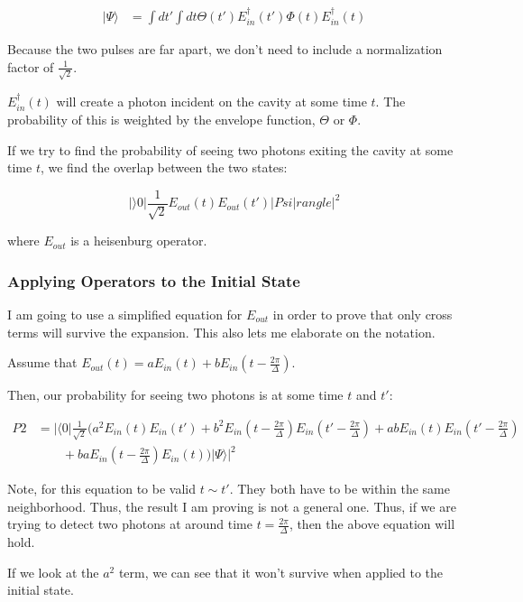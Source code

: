 \documentclass[12pt]{article}
\begin{document}
\begin{align}
| \Psi \rangle &= \int d t' \int dt \Theta(t') E^\dagger_{in}(t') \Phi (t) E^\dagger_{in}(t)
\end{align}

Because the two pulses are far apart, we don't need to include a normalization factor of $\frac{1}{\sqrt{2}}$.

$E^\dagger_{in}(t)$ will create a photon incident on the cavity at some time $t$. The probability of this is weighted by
the envelope function, $\Theta$ or $\Phi$.

If we try to find the probability of seeing two photons exiting the cavity at some time $t$, we find the overlap between the two states:

\begin{equation}
| \rangle 0 | \frac{1}{\sqrt{2}} E_{out}(t) E_{out}(t') |Psi |rangle |^2
\end{equation}

where $E_{out}$ is a heisenburg operator.
\subsubsection{Applying Operators to the Initial State}
\label{sec:crossterms}
I am going to use a simplified equation for $E_{out}$ in order to prove that only cross terms will survive the expansion. This also lets me elaborate on the notation.

Assume that $E_{out}(t) = a E_{in}(t) + b E_{in}(t-\frac{2\pi}{\Delta})$. 

Then, our probability for seeing two photons is at some time $t$ and $t'$:

\begin{align}
P2 &= | \langle 0 | \frac{1}{\sqrt{2}} (a^2 E_{in}(t) E_{in}(t') + b^2 E_{in}(t-\frac{2\pi}{\Delta}) E_{in}(t'-\frac{2\pi}{\Delta}) + ab E_{in}(t)E_{in}(t'-\frac{2\pi}{\Delta}) \\
& \qquad+ baE_{in}(t-\frac{2\pi}{\Delta})E_{in}(t) ) |\Psi \rangle |^2 
\end{align}

Note, for this equation to be valid $t\sim t'$. They both have to be within the same neighborhood. Thus, the
result I am proving is not a general one. Thus, if we are trying to detect two photons at around time $t =\frac{2 \pi}{\Delta}$, then the above equation will hold.

If we look at the $a^2$ term, we can see that it won't survive when applied to the initial state.
\end{document}
